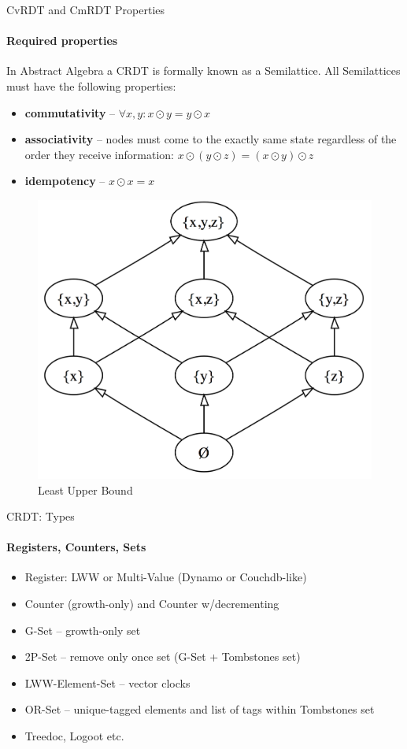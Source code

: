 \documentclass{beamer}
\begin{document}
\begin{frame}{CvRDT and CmRDT Properties}
\framesubtitle{Required properties}

In Abstract Algebra a CRDT is formally known as a Semilattice.
All Semilattices must have the following properties:

\begin{itemize}
	\item \textbf{commutativity} – $\forall x, y : x \odot y = y \odot x$
	\item \textbf{associativity} – nodes must come to the exactly same state regardless of the order they receive information: $x \odot (y \odot z) = (x \odot y) \odot z$
	\item \textbf{idempotency} – $x \odot x = x$
\end{itemize}

\begin{figure}[!ht]
	\includegraphics[scale=0.15]{LUB.png}    
	\caption{Least Upper Bound}
\end{figure}

\end{frame}


\begin{frame}{CRDT: Types}
\framesubtitle{Registers, Counters, Sets}

\begin{itemize}
  \item Register: LWW or Multi-Value (Dynamo or Couchdb-like)
  \item Counter (growth-only) and Counter w/decrementing
  \item G-Set – growth-only set
  \item 2P-Set – remove only once set (G-Set + Tombstones set)
  \item LWW-Element-Set – vector clocks 
  \item OR-Set – unique-tagged elements and list of tags within Tombstones set
  \item Treedoc, Logoot etc.
\end{itemize}
\end{frame}
\end{document}

